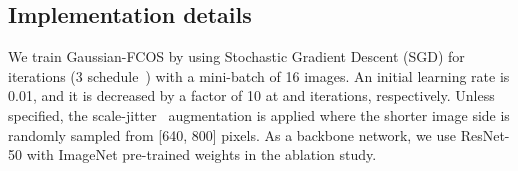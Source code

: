 \documentclass[final]{cvpr}
\begin{document}
\begin{table}[t]
  \centering
    \caption{\textbf{Effectiveness of power likelihood.}  denotes negative{\hspace{0.2ex}}log-likelihood{\hspace{0.2ex}}loss{\hspace{0.2ex}}(NLL).{\hspace{0.2ex}}The{\hspace{0.2ex}}proposed{\hspace{0.2ex}}uncertainty loss with IoU power term (NPLL) improves the baseline.
    \label{tab:uncertainty}
  }
\end{table}


\subsection{Implementation details}
We train Gaussian-FCOS by using Stochastic Gradient Descent (SGD) for  iterations (3 schedule~\cite{He_2019_ICCV}) with a mini-batch of 16 images.
An initial learning rate is 0.01, and it is decreased by a factor of 10 at  and  iterations, respectively.
Unless specified, the scale-jitter~\cite{He_2019_ICCV} augmentation is applied where the shorter image side is randomly sampled from [640, 800] pixels.
As a backbone network, we use ResNet-50 with ImageNet pre-trained weights in the ablation study.
\end{document}
